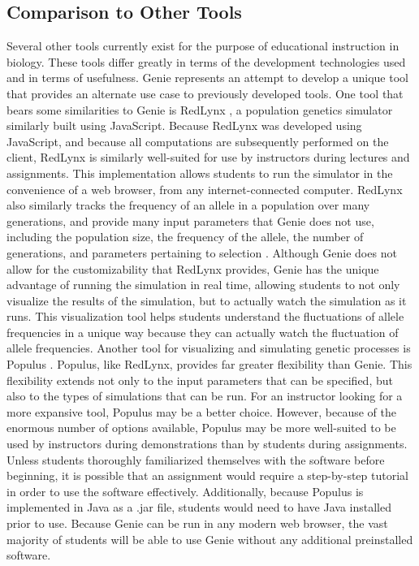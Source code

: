\documentclass[12pt]{article}
\begin{document}
\begin{spacing}{1.5}
\subsection{Comparison to Other Tools}
Several other tools currently exist for the purpose of educational instruction in biology. These tools differ greatly in terms of the development technologies used and in terms of usefulness. Genie represents an attempt to develop a unique tool that provides an alternate use case to previously developed tools. One tool that bears some similarities to Genie is RedLynx \cite{redlynx}, a population genetics simulator similarly built using JavaScript. Because RedLynx was developed using JavaScript, and because all computations are subsequently performed on the client, RedLynx is similarly well-suited for use by instructors during lectures and assignments. This implementation allows students to run the simulator in the convenience of a web browser, from any internet-connected computer. RedLynx also similarly tracks the frequency of an allele in a population over many generations, and provide many input parameters that Genie does not use, including the population size, the frequency of the allele, the number of generations, and parameters pertaining to selection \cite{redlynx}. Although Genie does not allow for the customizability that RedLynx provides, Genie has the unique advantage of running the simulation in real time, allowing students to not only visualize the results of the simulation, but to actually watch the simulation as it runs. This visualization tool helps students understand the fluctuations of allele frequencies in a unique way because they can actually watch the fluctuation of allele frequencies.\newline
\newline
Another tool for visualizing and simulating genetic processes is Populus \cite{populus}. Populus, like RedLynx, provides far greater flexibility than Genie. This flexibility extends not only to the input parameters that can be specified, but also to the types of simulations that can be run. For an instructor looking for a more expansive tool, Populus may be a better choice. However, because of the enormous number of options available, Populus may be more well-suited to be used by instructors during demonstrations than by students during assignments. Unless students thoroughly familiarized themselves with the software before beginning, it is possible that an assignment would require a step-by-step tutorial in order to use the software effectively. Additionally, because Populus is implemented in Java as a .jar file, students would need to have Java installed prior to use. Because Genie can be run in any modern web browser, the vast majority of students will be able to use Genie without any additional preinstalled software.\newline

\end{spacing}
\end{document}
